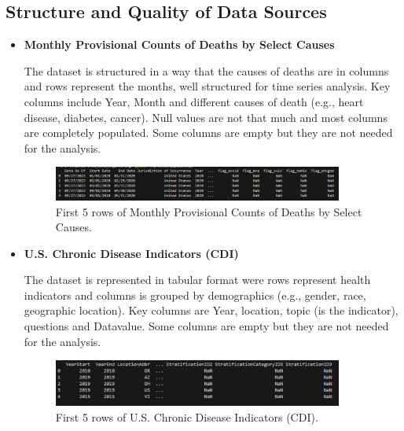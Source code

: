 \documentclass[a4paper,10pt]{article}
\begin{document}
	\subsection{Structure and Quality of Data Sources}
	\begin{itemize}
		\item \textbf{Monthly Provisional Counts of Deaths by Select Causes}
		
		The dataset is structured in a way that the causes of deaths are in columns and rows represent the months, well structured for time series analysis. Key columns include Year, Month and different causes of death (e.g., heart disease, diabetes, cancer). Null values are not that much and most columns are completely populated. Some columns are empty but they are not needed for the analysis.
		\begin{figure}[ht!]
			\centering
			\includegraphics[width=0.9\textwidth]{images/dataset-1.png}
			\caption{First 5 rows of Monthly Provisional Counts of Deaths by Select Causes.}
			\label{fig:dataset1}
		\end{figure}
	\end{itemize}
	\begin{itemize}
		\item \textbf{U.S. Chronic Disease Indicators (CDI)} 
		
		The dataset is represented in tabular format were rows represent health indicators and columns is grouped by demographics (e.g., gender, race, geographic location). Key columns are Year, location, topic (is the indicator), questions and Datavalue. Some columns are empty but they are not needed for the analysis.
		\begin{figure}[ht!]
			\centering
			\includegraphics[width=0.9\textwidth]{images/dataset-2.png}
			\caption{First 5 rows of U.S. Chronic Disease Indicators (CDI).}
			\label{fig:dataset2}
		\end{figure}
		
	\end{itemize}
\end{document}

